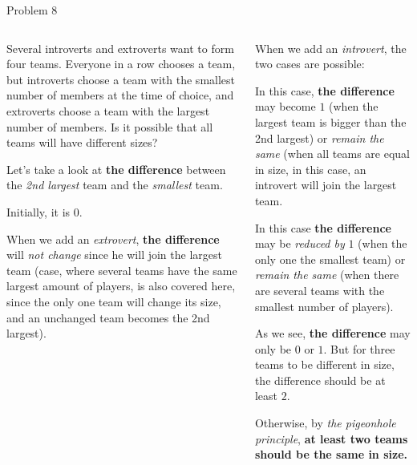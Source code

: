 \documentclass[9pt,aspectratio=169]{beamer}
\begin{document}
\begin{frame}{Problem 8}
  \begin{columns}[T]
    \begin{column}{0.5\textwidth}
      \begin{problem}
        Several introverts and extroverts want to form four teams. Everyone in a row chooses a team, but introverts choose a team with the smallest number of members at the time of choice, and extroverts choose a team with the largest number of members. Is it possible that all teams will have different sizes?
      \end{problem}
      Let's take a look at \textbf{the difference} between the \emph{2nd largest} team and the \emph{smallest} team. 
      
      Initially, it is $0$.\medskip

      When we add an \emph{extrovert}, \textbf{the difference} will \emph{not change} since he will join the largest team (case, where several teams have the same largest amount of players, is also covered here, since the only one team will change its size, and an unchanged team becomes the 2nd largest).

    \end{column}
    \begin{column}{0.5\textwidth}
      When we add an \emph{introvert}, the two cases are possible: 

      \begin{description}[wide]
        \item[\textbf{the difference} is $0$:] In this case, \textbf{the difference} may become $1$ (when the largest team is bigger than the 2nd largest) or \emph{remain the same} (when all teams are equal in size, in this case, an introvert will join the largest team.

        \item[\textbf{the difference} is not $0$:] In this case \textbf{the difference} may be \emph{reduced by} $1$ (when the only one the smallest team) or \emph{remain the same} (when there are several teams with the smallest number of players).
      \end{description}


      As we see, \textbf{the difference} may only be $0$ or $1$. But for three teams to be different in size, the difference should be at least $2$. 
      
      Otherwise, by \emph{the pigeonhole principle}, \textbf{at least two teams should be the same in size.}
    \end{column}
  \end{columns}
\end{frame}
\end{document}

